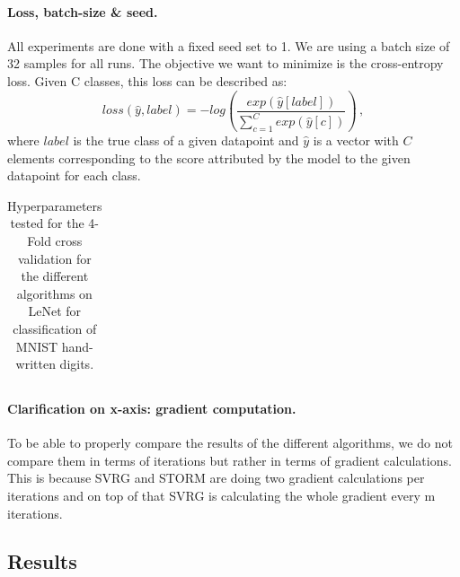 \documentclass[a4paper,11pt,oneside]{report}
\begin{document}
\paragraph{Loss, batch-size \& seed.}
All experiments are done with a fixed seed set to 1. We are using a batch size of 32 samples for all runs. The objective we want to minimize is the cross-entropy loss. Given C classes, this loss can be described as:
\begin{equation}\label{eq:CrossEntropyLoss}
    loss(\hat{y}, label) = -log\left(\frac{exp(\hat{y}[label])}{\sum_{c=1}^C exp(\hat{y}[c])}\right)\,,
\end{equation}
where $label$ is the true class of a given datapoint and $\hat{y}$ is a vector with $C$ elements corresponding to the score attributed by the model to the given datapoint for each class.

\begin{table}
    \begin{center}
        \begin{tabular}{||c | c | l||}
             \hline
             
        \end{tabular}
    \end{center}
    \caption{Hyperparameters tested for the 4-Fold cross validation for the different algorithms on LeNet for classification of MNIST hand-written digits.
    }
    \label{tbl:CVhyperparametersMNIST}
\end{table}

\paragraph{Clarification on x-axis: gradient computation.}
To be able to properly compare the results of the different algorithms, we do not compare them in terms of iterations but rather in terms of gradient calculations. This is because SVRG and STORM are doing two gradient calculations per iterations and on top of that SVRG is calculating the whole gradient every m iterations.


\subsection{Results}
\end{document}
